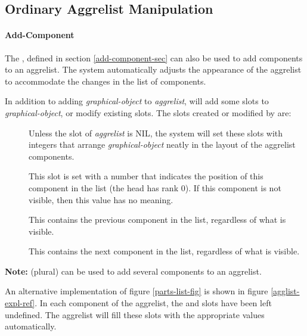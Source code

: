 \subsection{Ordinary Aggrelist Manipulation}
\label{aggrelist-manipulation-sec}

\paragraph{Add-Component}

The , defined in section \ref{add-component-sec} can also
be used to add components to an aggrelist.  The system automatically adjusts
the appearance of the aggrelist to accommodate the changes in the list of
components.

In addition to adding {\it graphical-object} to {\it aggrelist},
 will add some slots to {\it graphical-object}, or modify
existing slots.  The slots created or modified by  are:

\begin{description}
\item[]  \value{shortdash} Unless the  slot of
{\it aggrelist} is NIL, the system will set these slots with integers that
arrange {\it graphical-object} neatly in the layout of the aggrelist components.

\item[]  \value{shortdash} This slot is set with a number that indicates
the position of this component in the list (the head has rank 0).  If this
component is not visible, then this value has no meaning.

\item[]  \value{shortdash} This contains the previous component in the list,
regardless of what is visible.

\item[]  \value{shortdash} This contains the next component in the list,
regardless of what is visible.

\end{description}

{\bf Note:}  (plural) can be used to add several
components to an aggrelist.

An alternative implementation of figure \ref{parts-list-fig} is shown in
figure \ref{agglist-expl-ref}.  In each component of the aggrelist, the
 and  slots have been left undefined.  The aggrelist will
fill these slots with the appropriate values automatically.

